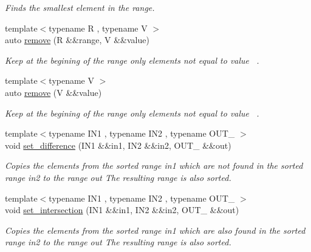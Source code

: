 \begin{DoxyCompactItemize}
\begin{DoxyCompactList}\small\item\em Finds the smallest element in the range. \end{DoxyCompactList}\item 
{\footnotesize template$<$typename R , typename V $>$ }\\auto \mbox{\hyperlink{namespacerah_a17e1a9932fa73843f5431920ebf6cefb}{remove}} (R \&\&range, V \&\&value)
\begin{DoxyCompactList}\small\item\em Keep at the begining of the range only elements not equal to value~\newline
. \end{DoxyCompactList}\item 
{\footnotesize template$<$typename V $>$ }\\auto \mbox{\hyperlink{namespacerah_a8f9d8b6cbb2431bddd42cc4e2378f13f}{remove}} (V \&\&value)
\begin{DoxyCompactList}\small\item\em Keep at the begining of the range only elements not equal to value~\newline
. \end{DoxyCompactList}\item 
{\footnotesize template$<$typename I\+N1 , typename I\+N2 , typename O\+U\+T\+\_\+ $>$ }\\void \mbox{\hyperlink{namespacerah_a8e9bc244c82d3435e1c8b6bf08696161}{set\+\_\+difference}} (I\+N1 \&\&in1, I\+N2 \&\&in2, O\+U\+T\+\_\+ \&\&out)
\begin{DoxyCompactList}\small\item\em Copies the elements from the sorted range in1 which are not found in the sorted range in2 to the range out The resulting range is also sorted. \end{DoxyCompactList}\item 
{\footnotesize template$<$typename I\+N1 , typename I\+N2 , typename O\+U\+T\+\_\+ $>$ }\\void \mbox{\hyperlink{namespacerah_a8819752794096b634c6153560fc21cc5}{set\+\_\+intersection}} (I\+N1 \&\&in1, I\+N2 \&\&in2, O\+U\+T\+\_\+ \&\&out)
\begin{DoxyCompactList}\small\item\em Copies the elements from the sorted range in1 which are also found in the sorted range in2 to the range out The resulting range is also sorted. \end{DoxyCompactList}\end{DoxyCompactItemize}

